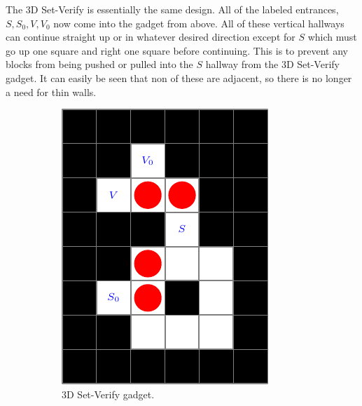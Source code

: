 \documentclass[11pt]{article}
\begin{document}
The 3D Set-Verify is essentially the same design. All of the labeled entrances, $S, S_0, V, V_0$ now come into the gadget from above. All of these vertical hallways can continue straight up or in whatever desired direction except for $S$ which must go up one square and right one square before continuing. This is to prevent any blocks from being pushed or pulled into the $S$ hallway from the 3D Set-Verify gadget. It can easily be seen that non of these are adjacent, so there is no longer a need for thin walls. 
\begin{figure}[!ht]
  \centering
  \caption{Set-Verify Gadgets}
  \begin{subfigure}[b]{0.45\textwidth}
    \includegraphics[width=\textwidth]{SetVerify3D}
    \caption{3D Set-Verify gadget.}
    \label{ldeCoeffs}
  \end{subfigure}
  \hfill
  \begin{subfigure}[b]{0.45\textwidth}

\end{subfigure}
\end{figure}
\end{document}
